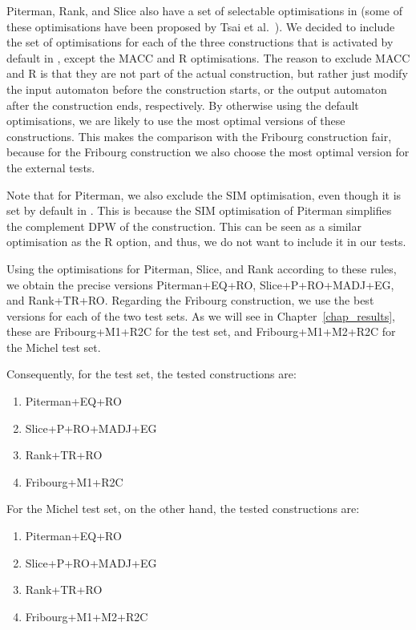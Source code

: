 Piterman, Rank, and Slice also have a set of selectable optimisations in \goal{} (some of these optimisations have been proposed by Tsai et al.~\cite{2011_tsai}). We decided to include the set of optimisations for each of the three constructions that is activated by default in \goal, except the MACC and R optimisations. The reason to exclude MACC and R is that they are not part of the actual construction, but rather just modify the input automaton before the construction starts, or the output automaton after the construction ends, respectively. By otherwise using the default optimisations, we are likely to use the most optimal versions of these constructions. This makes the comparison with the Fribourg construction fair, because for the Fribourg construction we also choose the most optimal version for the external tests.

Note that for Piterman, we also exclude the SIM optimisation, even though it is set by default in \goal. This is because the SIM optimisation of Piterman simplifies the complement DPW of the construction. This can be seen as a similar optimisation as the R option, and thus, we do not want to include it in our tests.

Using the optimisations for Piterman, Slice, and Rank according to these rules, we obtain the precise versions Piterman+EQ+RO, Slice+P+RO+MADJ+EG, and Rank+TR+RO. Regarding the Fribourg construction, we use the best versions for each of the two test sets. As we will see in Chapter~\ref{chap_results}, these are Fribourg+M1+R2C for the \goal{} test set, and Fribourg+M1+M2+R2C for the Michel test set.

Consequently, for the \goal{} test set, the tested constructions are:

\begin{enumerate}
\item Piterman+EQ+RO
\item Slice+P+RO+MADJ+EG
\item Rank+TR+RO
\item Fribourg+M1+R2C
\end{enumerate}

For the Michel test set, on the other hand, the tested constructions are:

\begin{enumerate}
\item Piterman+EQ+RO
\item Slice+P+RO+MADJ+EG
\item Rank+TR+RO
\item Fribourg+M1+M2+R2C
\end{enumerate}



